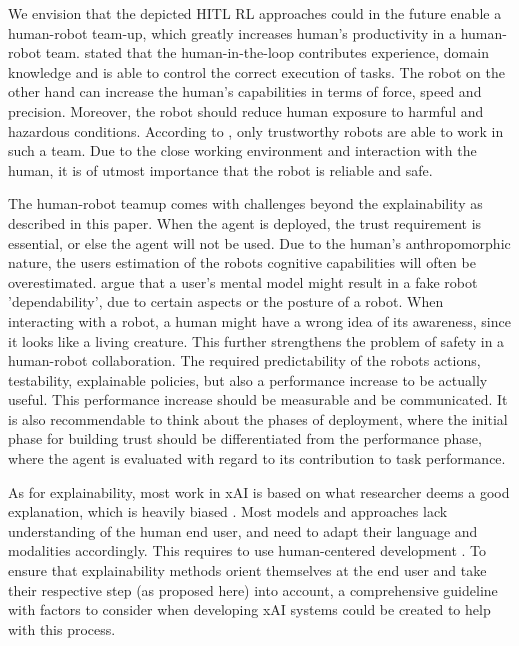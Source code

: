 \documentclass[twoside,11pt]{article}
\begin{document}
We envision that the depicted HITL RL approaches could in the future enable a human-robot team-up, which greatly increases human's productivity in a human-robot team. \citet{KhatibEtAl:1999:RihEnvironment} stated that the human-in-the-loop contributes experience, domain knowledge and is able to control the correct execution of tasks. The robot on the other hand can increase the human's capabilities in terms of force, speed and precision. Moreover, the robot should reduce human exposure to harmful and hazardous conditions. According to \citep{DeSaintsEtAl:2008:phri}, only trustworthy robots are able to work in such a team. Due to the close working environment and interaction with the human, it is of utmost importance that the robot is reliable and safe.


The human-robot teamup comes with challenges beyond the explainability as described in this paper. When the agent is deployed, the trust requirement is essential, or else the agent will not be used.  Due to the human's anthropomorphic nature, the users estimation of the robots cognitive capabilities will often be overestimated. \citet{DeSaintsEtAl:2008:phri} argue that a user's mental model might result in a fake robot 'dependability', due to certain aspects or the posture of a robot. When interacting with a robot, a human might have a wrong idea of its awareness, since it looks like a living creature. This further strengthens the problem of safety in a human-robot collaboration. The required predictability of the robots actions, testability, explainable policies, but also a performance increase to be actually useful. This performance increase should be measurable and be communicated. It is also recommendable to think about the phases of deployment, where the initial phase for building trust should be differentiated from the performance phase, where the agent is evaluated with regard to its contribution to task performance. 


As for explainability, most work in xAI is based on what researcher deems a good explanation, which is heavily biased \citep{Miller:2019:xAISocialSciencesInsights}. Most models and approaches lack understanding of the human end user, and need to adapt their language and modalities accordingly. This requires to use human-centered development \citep{PuiuttaVeith:2020:xAIRLSurvey}. To ensure that explainability methods orient themselves at the end user and take their respective step (as proposed here) into account, a comprehensive guideline with factors to consider when developing xAI systems could be created to help with this process.
\end{document}
